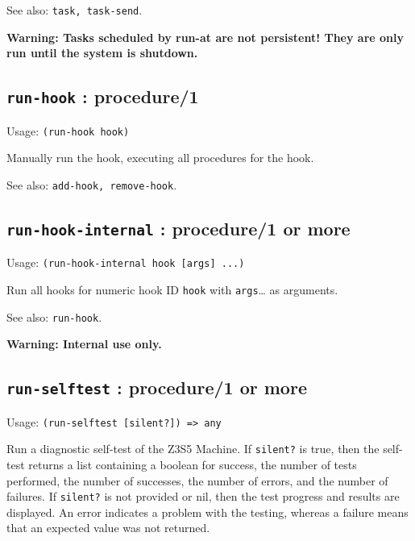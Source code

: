 \documentclass[
]{article}
\newcommand{\passthrough}[1]{#1}
\begin{document}
See also: \passthrough{\lstinline!task, task-send!}.

\textbf{Warning: Tasks scheduled by run-at are not persistent! They are
only run until the system is shutdown.}

\hypertarget{run-hook-procedure1-1}{%
\subsection{\texorpdfstring{\texttt{run-hook} :
procedure/1}{run-hook : procedure/1}}\label{run-hook-procedure1-1}}

Usage: \passthrough{\lstinline!(run-hook hook)!}

Manually run the hook, executing all procedures for the hook.

See also: \passthrough{\lstinline!add-hook, remove-hook!}.

\hypertarget{run-hook-internal-procedure1-or-more-1}{%
\subsection{\texorpdfstring{\texttt{run-hook-internal} : procedure/1 or
more}{run-hook-internal : procedure/1 or more}}\label{run-hook-internal-procedure1-or-more-1}}

Usage: \passthrough{\lstinline!(run-hook-internal hook [args] ...)!}

Run all hooks for numeric hook ID \passthrough{\lstinline!hook!} with
\passthrough{\lstinline!args!}\ldots{} as arguments.

See also: \passthrough{\lstinline!run-hook!}.

\textbf{Warning: Internal use only.}

\hypertarget{run-selftest-procedure1-or-more-1}{%
\subsection{\texorpdfstring{\texttt{run-selftest} : procedure/1 or
more}{run-selftest : procedure/1 or more}}\label{run-selftest-procedure1-or-more-1}}

Usage: \passthrough{\lstinline!(run-selftest [silent?]) => any!}

Run a diagnostic self-test of the Z3S5 Machine. If
\passthrough{\lstinline!silent?!} is true, then the self-test returns a
list containing a boolean for success, the number of tests performed,
the number of successes, the number of errors, and the number of
failures. If \passthrough{\lstinline!silent?!} is not provided or nil,
then the test progress and results are displayed. An error indicates a
problem with the testing, whereas a failure means that an expected value
was not returned.
\end{document}
